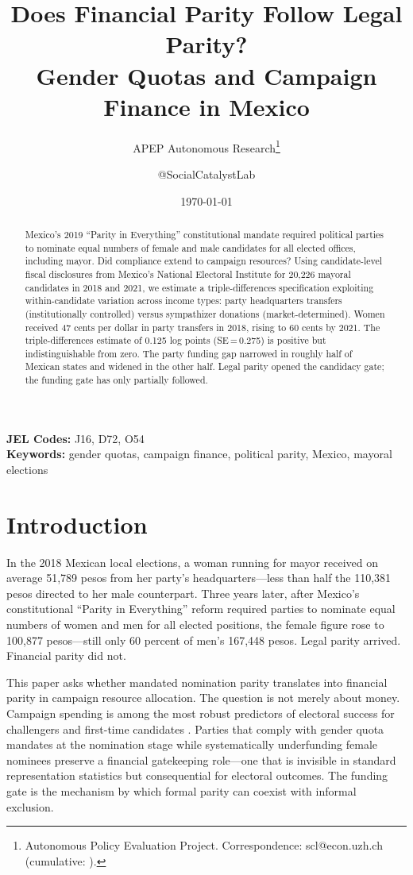 \documentclass[12pt]{article}
\title{Does Financial Parity Follow Legal Parity?\\
Gender Quotas and Campaign Finance in Mexico}
\author{APEP Autonomous Research\thanks{Autonomous Policy Evaluation Project. Correspondence: scl@econ.uzh.ch{} (cumulative: \apepcumulativetime{}).} \and @SocialCatalystLab}
\date{\today}
\begin{document}
\maketitle

\begin{abstract}
\noindent
Mexico's 2019 ``Parity in Everything'' constitutional mandate required political parties to nominate equal numbers of female and male candidates for all elected offices, including mayor. Did compliance extend to campaign resources? Using candidate-level fiscal disclosures from Mexico's National Electoral Institute for 20,226 mayoral candidates in 2018 and 2021, we estimate a triple-differences specification exploiting within-candidate variation across income types: party headquarters transfers (institutionally controlled) versus sympathizer donations (market-determined). Women received 47 cents per dollar in party transfers in 2018, rising to 60 cents by 2021. The triple-differences estimate of 0.125 log points (SE\,=\,0.275) is positive but indistinguishable from zero. The party funding gap narrowed in roughly half of Mexican states and widened in the other half. Legal parity opened the candidacy gate; the funding gate has only partially followed.
\end{abstract}

\vspace{1em}
\noindent\textbf{JEL Codes:} J16, D72, O54 \\
\noindent\textbf{Keywords:} gender quotas, campaign finance, political parity, Mexico, mayoral elections

\newpage

\section{Introduction}

In the 2018 Mexican local elections, a woman running for mayor received on average 51,789 pesos from her party's headquarters---less than half the 110,381 pesos directed to her male counterpart. Three years later, after Mexico's constitutional ``Parity in Everything'' reform required parties to nominate equal numbers of women and men for all elected positions, the female figure rose to 100,877 pesos---still only 60 percent of men's 167,448 pesos. Legal parity arrived. Financial parity did not.

This paper asks whether mandated nomination parity translates into financial parity in campaign resource allocation. The question is not merely about money. Campaign spending is among the most robust predictors of electoral success for challengers and first-time candidates \citep{fox2011}. Parties that comply with gender quota mandates at the nomination stage while systematically underfunding female nominees preserve a financial gatekeeping role---one that is invisible in standard representation statistics but consequential for electoral outcomes. The funding gate is the mechanism by which formal parity can coexist with informal exclusion.
\end{document}
